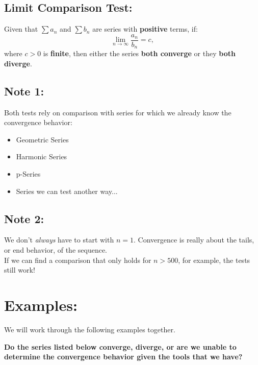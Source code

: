 \documentclass[10pt]{article}
\begin{document}

\subsection*{Limit Comparison Test:}
Given that \(\sum a_n\) and \(\sum b_n\) are series with \textbf{positive} terms, if:
\[
\lim_{n\rightarrow \infty} \frac{a_n}{b_n} = c,
\]
where \(c>0\) is \textbf{finite}, then either the series \textbf{both converge} or they \textbf{both diverge}.



\vspace*{.2in}
\setlength{\columnseprule}{0pt}
\setlength{\columnsep}{1em}

\subsection*{Note 1:}
Both tests rely on comparison with series for which we already know the convergence behavior:
\begin{itemize}
\item Geometric Series
\item Harmonic Series
\item p-Series
\item Series we can test another way...
\end{itemize}

\subsection*{Note 2:}
We don't \textit{always} have to start with \(n=1\). Convergence is really about the tails, or end behavior, of the sequence.\\ If we can find a comparison that only holds for \(n>500\), for example, the tests still work!



\section*{Examples:}
We will work through the following examples together.

\textbf{Do the series listed below converge, diverge, or are we unable to determine the convergence behavior given the tools that we have?}
\end{document}
